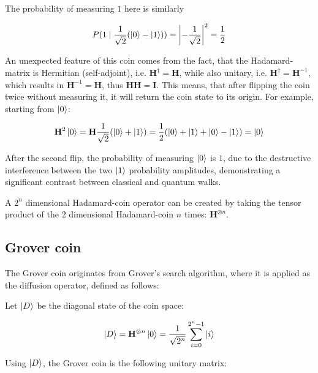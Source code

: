 The probability of measuring $1$ here is similarly

\begin{align*}
P(1 \mid \frac{1}{\sqrt{2}} (\ket{0} - \ket{1})) =
\left\lvert-\frac{1}{\sqrt{2}}\right\rvert^2 =
\frac{1}{2}
\end{align*}

An unexpected feature of this coin comes from the fact, that the Hadamard-matrix is Hermitian (self-adjoint), i.e. $\mathbf{H}^{\dagger} = \mathbf{H}$, while also unitary, i.e. $\mathbf{H}^{\dagger} = \mathbf{H}^{-1}$, which results in $\mathbf{H}^{-1} = \mathbf{H}$, thus $\mathbf{H}\mathbf{H} = \mathbf{I}$. This means, that after flipping the coin twice without measuring it, it will return the coin state to its origin. For example, starting from $\ket{0}$:

\begin{align*}
 \mathbf{H}^2 \ket{0} = \mathbf{H}\frac{1}{\sqrt{2}}(\ket{0} + \ket{1}) = \frac{1}{2}(\ket{0} + \ket{1} + \ket{0} - \ket{1}) = \ket{0}
\end{align*}

After the second flip, the probability of measuring $\ket{0}$ is $1$, due to the destructive interference between the two $\ket{1}$ probability amplitudes, demonstrating a significant contrast between classical and quantum walks.

\begin{definition}

A $2^n$ dimensional Hadamard-coin operator can be created by taking the tensor product of the $2$ dimensional Hadamard-coin $n$ times: $\mathbf{H}^{\otimes{}n}$.

\end{definition}

\subsection{Grover coin}

The Grover coin originates from Grover's search algorithm, where it is applied as the diffusion operator, defined as follows:

Let $\ket{D}$ be the diagonal state of the coin space:

\begin{align*}
\ket{D} = \mathbf{H}^{\otimes{}n}\ket{0} =
\frac{1}{\sqrt{2^n}} \sum\limits_{i=0}^{2^n-1} \ket{i}
\end{align*}

Using $\ket{D}$, the Grover coin is the following unitary matrix:

